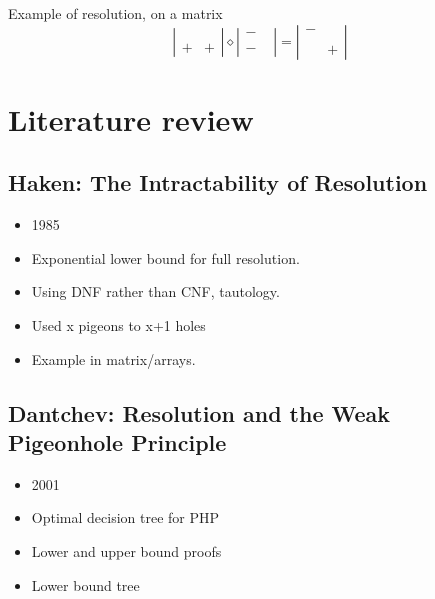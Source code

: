 \documentclass{report}
\DeclareMathOperator{\res}{\diamond} %
\begin{document}
Example of resolution, on a matrix
\[ \left| \begin{array}{ccc}
   &   \\
   &   \\
 + & + \end{array} \right| \res
 \left| \begin{array}{ccc}
 - &   \\
   &   \\
 - &   \end{array} \right|=
  \left| \begin{array}{ccc}
  - &   \\
    &   \\
    & + \end{array} \right|
  \]



\chapter{Literature review}
\label{cha:Literature}

\section{Haken: The Intractability of Resolution}
\label{sec:Haken1985Intractability}
\begin{itemize}
  \item 1985
  \item Exponential lower bound for full resolution.
  \item Using DNF rather than CNF, tautology.
  \item Used x pigeons to x+1 holes
  \item Example in matrix/arrays.
\end{itemize}
  \cite{Haken1985Intractability}

\section{Dantchev: Resolution and the Weak Pigeonhole Principle}
\label{sec:DantchevTreePHP}
\begin{itemize}
  \item 2001
  \item Optimal decision tree for PHP
  \item Lower and upper bound proofs
  \item Lower bound tree
\end{itemize} 
\cite{DantchevTreePHP}
\end{document}
